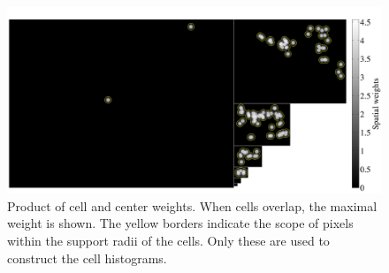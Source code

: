 \documentclass[thesis.tex]{subfiles}
\begin{document}
\begin{figure}[tb]
    \centering
    \includegraphics[width=\textwidth]{img/cellHistScaleSpacesSpatialWeights.pdf}
    \caption{Product of cell and center weights. When cells overlap, the maximal weight is shown. The yellow borders indicate the scope of pixels within the support radii of the cells. Only these are used to construct the cell histograms.}
    \label{fig:cellHistScaleSpacesSpatialWeights}
\end{figure}
\end{document}
